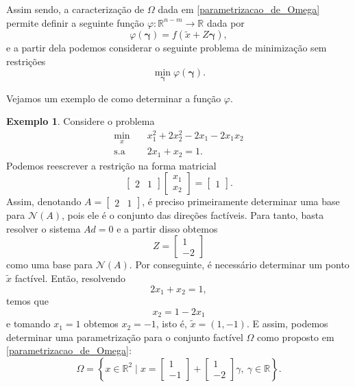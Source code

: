 \documentclass[12pt,a4paper]{scrartcl}
\def\RR{\mathds{R}}
\theoremstyle{definition}%
\newtheorem{exem}{Exemplo}
\begin{document}
Assim sendo, a caracterização de $\Omega$ dada em \eqref{parametrizacao_de_Omega} permite definir a seguinte função $\varphi : \RR^{n-m} \rightarrow \RR$ dada por
\[ \label{funcao_phi_restricoes_igualdade}
\varphi (\boldsymbol{\gamma}) = f(\tilde{x} + Z\boldsymbol{\gamma}),
\]
e a partir dela podemos considerar o seguinte problema de minimização sem restrições
\[ \label{problema_minimizacao_irrestrita_phi}
\min_{\boldsymbol{\gamma}} \varphi (\boldsymbol{\gamma}) .
\]

Vejamos um exemplo de como determinar a função $\varphi$.

\begin{exem}
Considere o problema 
\[ \label{exem:parametrizacao_omega}
\begin{aligned}
\min_{x} & \quad x_{1}^{2} + 2x_{2}^{2} - 2x_{1} - 2x_{1}x_{2} \\
\text{s.a} & \quad 2x_{1} + x_{2} = 1 .
\end{aligned}
\]
Podemos reescrever a restrição na forma matricial
\[
\begin{bmatrix*} 2 & 1 \end{bmatrix*} \begin{bmatrix*} x_{1} \\ x_{2} \end{bmatrix*} = \begin{bmatrix*} 1 \end{bmatrix*} .
\]
Assim, denotando $A= \begin{bmatrix*} 2 & 1 \end{bmatrix*}$, é preciso primeiramente determinar uma base para $\mathcal{N}(A)$, pois ele é o conjunto das direções factíveis. Para tanto, basta resolver o sistema $Ad =0$ e a partir disso obtemos 
\[ \label{eq:1_exem_parametrizacao_omega}
Z = \begin{bmatrix*} 1 \\ -2 \end{bmatrix*}
\]
como uma base para $\mathcal{N}(A)$. Por conseguinte, é necessário determinar um ponto $\tilde{x}$ factível. Então, resolvendo
\[
2x_{1} + x_{2} = 1 ,
\]
temos que 
\[
x_{2} = 1 - 2x_{1}
\]
e tomando $x_{1} =1$ obtemos $x_{2} = -1$, isto é, $\tilde{x} = (1,-1)$. E assim, podemos determinar uma parametrização para o conjunto factível $\Omega$ como proposto em \eqref{parametrizacao_de_Omega}:
\[
\Omega = \left\{ x\in \RR^{2} \mid x = \begin{bmatrix*} 1 \\ -1 \end{bmatrix*} + \begin{bmatrix*} 1 \\ -2 \end{bmatrix*} \gamma , \ \gamma \in \RR \right\} .
\]
\end{exem}
\end{document}
